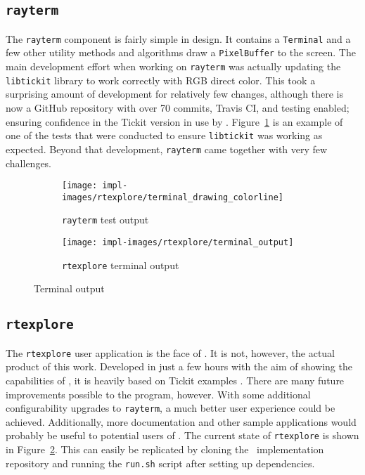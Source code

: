 \subsection{\texttt{rayterm}}\label{ch:implementation:final:rayterm}

The \texttt{rayterm} component is fairly simple in design.
It contains a \texttt{Terminal} and a few other utility methods and algorithms draw a \texttt{PixelBuffer} to the screen.
The main development effort when working on \texttt{rayterm} was actually updating the \texttt{libtickit} library \cite{libtickitLibrary, libtickitCustom} to work correctly with RGB direct color.
This took a surprising amount of development for relatively few changes, although there is now a GitHub repository with over 70 commits, Travis CI, and testing enabled; ensuring confidence in the Tickit version in use by \name.
Figure~\ref{fig:terminal_colorline} is an example of one of the tests that were conducted to ensure \texttt{libtickit} was working as expected.
Beyond that development, \texttt{rayterm} came together with very few challenges.

\vspace{0.3em}
\begin{figure}[htb]
  \centering
  \begin{subfigure}[htb]{0.48\textwidth}
    \texttt{[image: impl-images/rtexplore/terminal\_drawing\_colorline]}
    \caption{\texttt{rayterm} test output}
    \label{fig:terminal_colorline}
  \end{subfigure}
  \begin{subfigure}[htb]{0.48\textwidth}
    \texttt{[image: impl-images/rtexplore/terminal\_output]}
    \caption{\texttt{rtexplore} terminal output}
    \label{fig:rtexplore_terminal}
  \end{subfigure}
  \caption{Terminal output}
  \label{fig:rayterm_terminal_output}
\end{figure}

\subsection{\texttt{rtexplore}}\label{ch:implementation:final:rtexplore}

The \texttt{rtexplore} user application is the face of \name.
It is not, however, the actual product of this work.
Developed in just a few hours with the aim of showing the capabilities of \name, it is heavily based on Tickit examples \cite{libtickitLibrary}.
There are many future improvements possible to the program, however.
With some additional configurability upgrades to \texttt{rayterm}, a much better user experience could be achieved.
Additionally, more documentation and other sample applications would probably be useful to potential users of \name.
The current state of \texttt{rtexplore} is shown in Figure~\ref{fig:rtexplore_terminal}.
This can easily be replicated by cloning the \name\ implementation repository \cite{raytermGpuImpl} and running the \texttt{run.sh} script after setting up dependencies.
